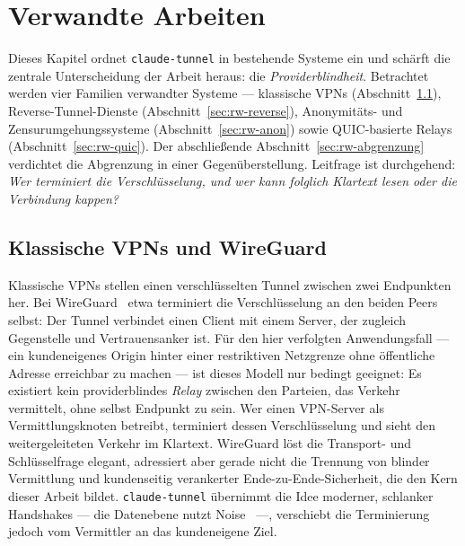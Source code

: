 \chapter{Verwandte Arbeiten}
\label{ch:relatedwork}

Dieses Kapitel ordnet \texttt{claude-tunnel} in bestehende Systeme ein und
schärft die zentrale Unterscheidung der Arbeit heraus: die
\emph{Providerblindheit}. Betrachtet werden vier Familien verwandter Systeme ---
klassische VPNs (Abschnitt~\ref{sec:rw-vpn}), Reverse-Tunnel-Dienste
(Abschnitt~\ref{sec:rw-reverse}), Anonymitäts- und Zensurumgehungssysteme
(Abschnitt~\ref{sec:rw-anon}) sowie QUIC-basierte Relays
(Abschnitt~\ref{sec:rw-quic}). Der abschließende Abschnitt~\ref{sec:rw-abgrenzung}
verdichtet die Abgrenzung in einer Gegenüberstellung. Leitfrage ist durchgehend:
\emph{Wer terminiert die Verschlüsselung, und wer kann folglich Klartext lesen
oder die Verbindung kappen?}

\section{Klassische VPNs und WireGuard}
\label{sec:rw-vpn}

Klassische VPNs stellen einen verschlüsselten Tunnel zwischen zwei Endpunkten
her. Bei WireGuard~\cite{donenfeld2017wireguard} etwa terminiert die Verschlüsselung an den beiden Peers
selbst: Der Tunnel verbindet einen Client mit einem Server, der zugleich
Gegenstelle und Vertrauensanker ist. Für den hier verfolgten Anwendungsfall ---
ein kundeneigenes Origin hinter einer restriktiven Netzgrenze ohne öffentliche
Adresse erreichbar zu machen --- ist dieses Modell nur bedingt geeignet: Es
existiert kein providerblindes \emph{Relay} zwischen den Parteien, das Verkehr
vermittelt, ohne selbst Endpunkt zu sein. Wer einen VPN-Server als
Vermittlungsknoten betreibt, terminiert dessen Verschlüsselung und sieht den
weitergeleiteten Verkehr im Klartext. WireGuard löst die Transport- und
Schlüsselfrage elegant, adressiert aber gerade nicht die Trennung von blinder
Vermittlung und kundenseitig verankerter Ende-zu-Ende-Sicherheit, die den Kern
dieser Arbeit bildet. \texttt{claude-tunnel} übernimmt die Idee moderner,
schlanker Handshakes --- die Datenebene nutzt Noise~\cite{noiseprotocol} ---,
verschiebt die Terminierung jedoch vom Vermittler an das kundeneigene Ziel.

